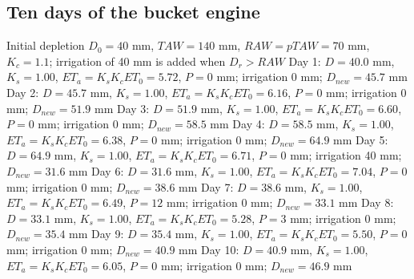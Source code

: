 \subsection{Ten days of the bucket engine}
\sol {}
\ans Initial depletion $D_0=40$ mm, $TAW=140$ mm, $RAW=pTAW=70$ mm, $K_c=1.1$; irrigation of 40 mm is added when $D_r>RAW$
\ans Day 1: $D=40.0$ mm, $K_s=1.00$, $ET_a=K_sK_cET_0=5.72$, $P=0$ mm; irrigation 0 mm; $D_{new}=45.7$ mm
\ans Day 2: $D=45.7$ mm, $K_s=1.00$, $ET_a=K_sK_cET_0=6.16$, $P=0$ mm; irrigation 0 mm; $D_{new}=51.9$ mm
\ans Day 3: $D=51.9$ mm, $K_s=1.00$, $ET_a=K_sK_cET_0=6.60$, $P=0$ mm; irrigation 0 mm; $D_{new}=58.5$ mm
\ans Day 4: $D=58.5$ mm, $K_s=1.00$, $ET_a=K_sK_cET_0=6.38$, $P=0$ mm; irrigation 0 mm; $D_{new}=64.9$ mm
\ans Day 5: $D=64.9$ mm, $K_s=1.00$, $ET_a=K_sK_cET_0=6.71$, $P=0$ mm; irrigation 40 mm; $D_{new}=31.6$ mm
\ans Day 6: $D=31.6$ mm, $K_s=1.00$, $ET_a=K_sK_cET_0=7.04$, $P=0$ mm; irrigation 0 mm; $D_{new}=38.6$ mm
\ans Day 7: $D=38.6$ mm, $K_s=1.00$, $ET_a=K_sK_cET_0=6.49$, $P=12$ mm; irrigation 0 mm; $D_{new}=33.1$ mm
\ans Day 8: $D=33.1$ mm, $K_s=1.00$, $ET_a=K_sK_cET_0=5.28$, $P=3$ mm; irrigation 0 mm; $D_{new}=35.4$ mm
\ans Day 9: $D=35.4$ mm, $K_s=1.00$, $ET_a=K_sK_cET_0=5.50$, $P=0$ mm; irrigation 0 mm; $D_{new}=40.9$ mm
\ans Day 10: $D=40.9$ mm, $K_s=1.00$, $ET_a=K_sK_cET_0=6.05$, $P=0$ mm; irrigation 0 mm; $D_{new}=46.9$ mm \finans


